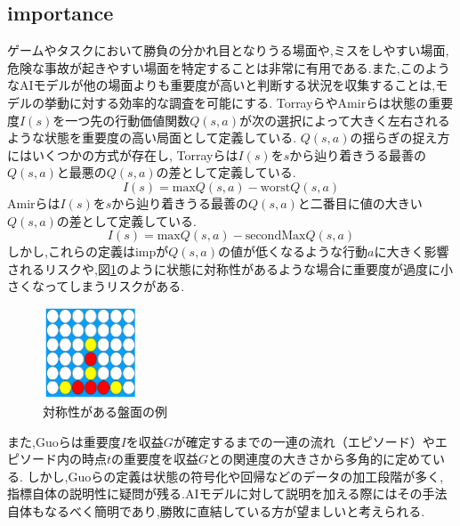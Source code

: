 \subsection{importance}
ゲームやタスクにおいて勝負の分かれ目となりうる場面や,ミスをしやすい場面,危険な事故が起きやすい場面を特定することは非常に有用である.また,このようなAIモデルが他の場面よりも重要度が高いと判断する状況を収集することは,モデルの挙動に対する効率的な調査を可能にする.
Torrayら\cite{imp2013}やAmirら\cite{imp2016}は状態の重要度$I(s)$を一つ先の行動価値関数$Q(s, a)$が次の選択によって大きく左右されるような状態を重要度の高い局面として定義している.
$Q(s, a)$の揺らぎの捉え方にはいくつかの方式が存在し,
Torrayらは$I(s)$を$s$から辿り着きうる最善の$Q(s, a)$と最悪の$Q(s, a)$の差として定義している.
\begin{equation}
	{I(s)= \textrm{max}Q(s, a)-\textrm{worst}Q(s, a)}
\end{equation}
Amirらは$I(s)$を$s$から辿り着きうる最善の$Q(s, a)$と二番目に値の大きい$Q(s, a)$の差として定義している.
\begin{equation}
    \label{imp}
	{I(s)= \textrm{max}Q(s, a)-\textrm{secondMax}Q(s, a)}
\end{equation}
しかし,これらの定義はimpが$Q(s, a)$の値が低くなるような行動$a$に大きく影響されるリスクや,図\ref{fig:symmetry}のように状態に対称性があるような場合に重要度が過度に小さくなってしまうリスクがある.
\begin{figure}[t]
	\centering
	\includegraphics[width=80pt]{./figure/symmetry.png}
	\caption{対称性がある盤面の例}
	\label{fig:symmetry}
\end{figure}
また,Guoら\cite{EDGE}は重要度$I$を収益$G$が確定するまでの一連の流れ（エピソード）やエピソード内の時点$t$の重要度を収益$G$との関連度の大きさから多角的に定めている.
しかし,Guoらの定義は状態の符号化や回帰などのデータの加工段階が多く,指標自体の説明性に疑問が残る.AIモデルに対して説明を加える際にはその手法自体もなるべく簡明であり,勝敗に直結している方が望ましいと考えられる.





